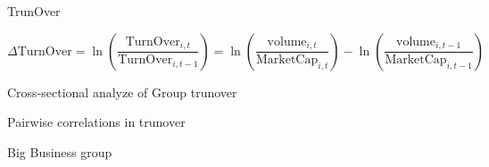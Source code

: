 \documentclass{beamer}
\begin{document}
	\begin{frame}{TrunOver}
	
	\begin{equation*}
		\Delta \text{TurnOver} = \ln(\frac{\text{TurnOver}_{i,t}}{\text{TurnOver}_{i,t-1}}) = 
		\ln({\frac{\text{volume}_{i,t}}{\text{MarketCap}_{i,t}}}) - \ln({\frac{\text{volume}_{i,t-1}}{\text{MarketCap}_{i,t-1}}})
	\end{equation*}
	
	\begin{table}[htbp]
		\centering
		\resizebox{0.95\textheight}{!}{
			
		}
	\end{table}
	
\end{frame}
\begin{frame}{Cross-sectional analyze of Group trunover}
	\begin{table}[htbp]
\centering
		\resizebox{0.95\textwidth}{!}{
			\centering
			
		}
		\label{Turnovercrosssection}
	\end{table}
\end{frame}

\begin{frame}{Pairwise correlations in  trunover}
	\begin{table}[htbp]
		\centering
		\resizebox{0.95\textwidth}{!}{
			\centering
			
		}
		\label{mresult2-turnover}
	\end{table}
\end{frame}

	\begin{frame}{Big Business group}
		\begin{table}[htbp]
			\centering
			\resizebox{0.85\textheight}{!}{
				
			}
		\end{table}
	\end{frame}
\end{document}
